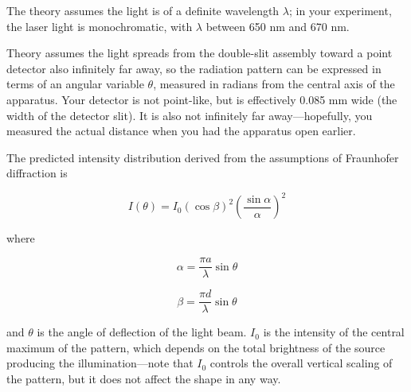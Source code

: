 \documentclass[11pt]{article}
\begin{document}
The theory assumes the light is of a definite wavelength $\lambda$; in your
experiment, the laser light is monochromatic, with $\lambda$ between 650 nm and
670 nm. %

Theory assumes the light spreads from the double-slit assembly toward a point
detector also infinitely far away, so the radiation pattern can be expressed in
terms of an angular variable $\theta$, measured in radians from the central axis
of the apparatus. Your detector is not point-like, but is effectively 0.085 mm
wide (the width of the detector slit). It is also not infinitely far away---hopefully,
you measured the actual distance when you had the apparatus open earlier.


The predicted intensity distribution derived from the assumptions of Fraunhofer
diffraction is

\begin{equation}
  I(\theta) = I_0\left( \cos\beta \right)^2\left( \frac{\sin\alpha}{\alpha}
  \right)^2
  \label{eq:Fraunhofer}
\end{equation}

\noindent where

\begin{equation}
  \alpha = \frac{\pi a}{\lambda}\sin\theta
\end{equation}

\begin{equation}
  \beta = \frac{\pi d}{\lambda}\sin\theta
\end{equation}

\noindent and $\theta$ is the angle of deflection of the light beam. $I_0$ is the
intensity of the central maximum of the pattern, which depends on the total 
brightness of the source producing the illumination---note that $I_0$ controls the 
overall vertical scaling of the pattern, but it does not affect the shape in any way.
\end{document}
